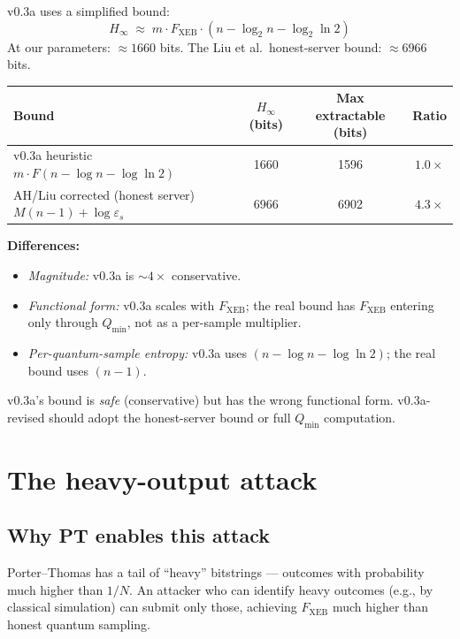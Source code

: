 \documentclass[11pt,a4paper]{article}
\theoremstyle{plain}
\theoremstyle{definition}
\theoremstyle{remark}
\newcommand{\Hmin}{H_{\infty}}
\begin{document}
v0.3a uses a simplified bound:
\begin{equation}
\Hmin \;\approx\; m \cdot F_{\mathrm{XEB}} \cdot (n - \log_2 n - \log_2 \ln 2)
\end{equation}
At our parameters: $\approx 1660$ bits. The Liu et al.\ honest-server bound: $\approx 6966$ bits.

\begin{center}
\small
\begin{tabular}{@{}lccc@{}}
\toprule
\textbf{Bound} & $\Hmin$ (bits) & Max extractable (bits) & Ratio \\
\midrule
v0.3a heuristic $m \cdot F (n - \log n - \log \ln 2)$ & 1660 & 1596 & $1.0\times$ \\
AH/Liu corrected (honest server) $M(n-1) + \log \varepsilon_s$ & 6966 & 6902 & $4.3\times$ \\
\bottomrule
\end{tabular}
\end{center}

\textbf{Differences:}
\begin{itemize}[itemsep=2pt,topsep=2pt]
  \item \emph{Magnitude:} v0.3a is $\sim 4\times$ conservative.
  \item \emph{Functional form:} v0.3a scales with $F_{\mathrm{XEB}}$; the real bound has $F_{\mathrm{XEB}}$ entering only through $Q_{\min}$, not as a per-sample multiplier.
  \item \emph{Per-quantum-sample entropy:} v0.3a uses $(n - \log n - \log \ln 2)$; the real bound uses $(n-1)$.
\end{itemize}

v0.3a's bound is \emph{safe} (conservative) but has the wrong functional form. v0.3a-revised should adopt the honest-server bound or full $Q_{\min}$ computation.

\section{The heavy-output attack}

\subsection{Why PT enables this attack}

Porter--Thomas has a tail of ``heavy'' bitstrings --- outcomes with probability much higher than $1/N$. An attacker who can identify heavy outcomes (e.g., by classical simulation) can submit only those, achieving $F_{\mathrm{XEB}}$ much higher than honest quantum sampling.
\end{document}
